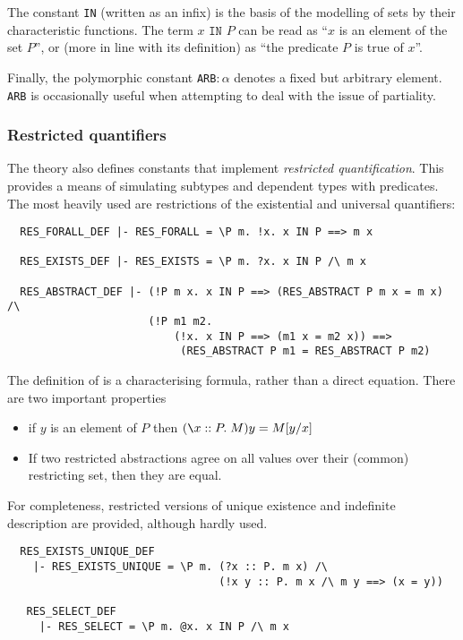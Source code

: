 The constant {\small\verb+IN+} (written as an infix) is the basis of
the modelling of sets by their characteristic functions.  The term
$x\texttt{ IN }P$ can be read as ``$x$ is an element of the set
$P$'', or (more in line with its definition) as ``the predicate $P$ is
true of $x$''.

Finally, the polymorphic constant {\small\verb+ARB+}$:\alpha$ denotes
a fixed but arbitrary element. {\small\verb+ARB+} is occasionally
useful when attempting to deal with the issue of partiality.

\subsubsection{Restricted quantifiers}\label{res-quant}

%
The theory  also defines constants that implement
\emph{restricted quantification}. This provides a means of simulating
subtypes and dependent types with predicates. The most heavily used
are restrictions of the existential and universal quantifiers:
%
\begin{verbatim}
  RES_FORALL_DEF |- RES_FORALL = \P m. !x. x IN P ==> m x

  RES_EXISTS_DEF |- RES_EXISTS = \P m. ?x. x IN P /\ m x

  RES_ABSTRACT_DEF |- (!P m x. x IN P ==> (RES_ABSTRACT P m x = m x) /\
                      (!P m1 m2.
                          (!x. x IN P ==> (m1 x = m2 x)) ==>
                           (RES_ABSTRACT P m1 = RES_ABSTRACT P m2)
\end{verbatim}
%
The definition of  is a characterising formula, rather
than a direct equation.  There are two important properties
\begin{itemize}
\item if $y$ is an element of $P$ then $(\bs{}x :: P.\; M)
  y = M[y/x]$
\item If two restricted abstractions agree on all values over their
  (common) restricting set, then they are equal.
\end{itemize}

For completeness, restricted versions of unique existence and
indefinite description are provided, although hardly used.
\begin{verbatim}
  RES_EXISTS_UNIQUE_DEF
    |- RES_EXISTS_UNIQUE = \P m. (?x :: P. m x) /\
                                 (!x y :: P. m x /\ m y ==> (x = y))

   RES_SELECT_DEF
     |- RES_SELECT = \P m. @x. x IN P /\ m x
\end{verbatim}

